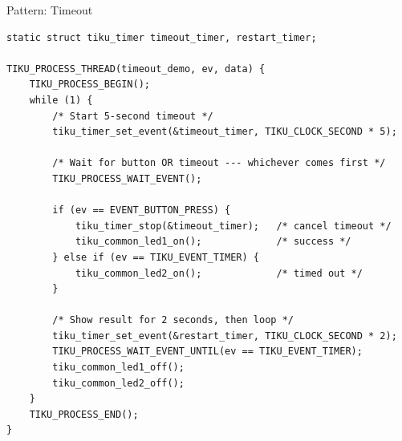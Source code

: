 \documentclass[aspectratio=169, 10pt]{beamer}
\begin{document}
\begin{frame}[fragile]{Pattern: Timeout}
\begin{lstlisting}[style=cstyle, title={examples/08\_timeout/timeout.c (simplified)}]
static struct tiku_timer timeout_timer, restart_timer;

TIKU_PROCESS_THREAD(timeout_demo, ev, data) {
    TIKU_PROCESS_BEGIN();
    while (1) {
        /* Start 5-second timeout */
        tiku_timer_set_event(&timeout_timer, TIKU_CLOCK_SECOND * 5);

        /* Wait for button OR timeout --- whichever comes first */
        TIKU_PROCESS_WAIT_EVENT();

        if (ev == EVENT_BUTTON_PRESS) {
            tiku_timer_stop(&timeout_timer);   /* cancel timeout */
            tiku_common_led1_on();             /* success */
        } else if (ev == TIKU_EVENT_TIMER) {
            tiku_common_led2_on();             /* timed out */
        }

        /* Show result for 2 seconds, then loop */
        tiku_timer_set_event(&restart_timer, TIKU_CLOCK_SECOND * 2);
        TIKU_PROCESS_WAIT_EVENT_UNTIL(ev == TIKU_EVENT_TIMER);
        tiku_common_led1_off();
        tiku_common_led2_off();
    }
    TIKU_PROCESS_END();
}
\end{lstlisting}
\end{frame}
\end{document}
